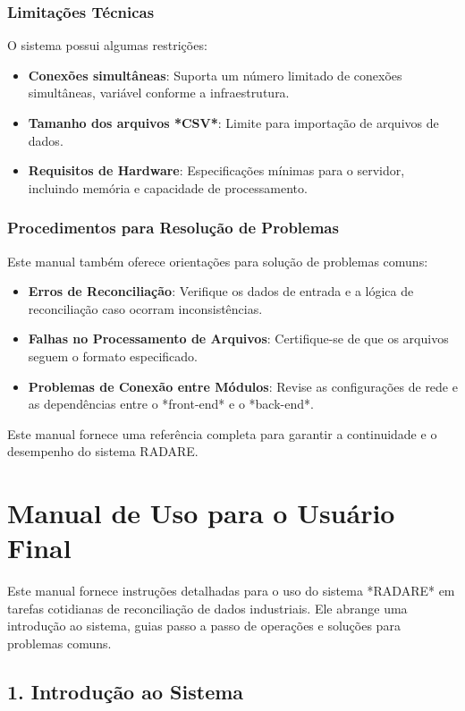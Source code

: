 \subsection*{Limitações Técnicas}

O sistema possui algumas restrições:
\begin{itemize}
    \item \textbf{Conexões simultâneas}: Suporta um número limitado de conexões simultâneas, variável conforme a infraestrutura.
    \item \textbf{Tamanho dos arquivos *CSV*}: Limite para importação de arquivos de dados.
    \item \textbf{Requisitos de Hardware}: Especificações mínimas para o servidor, incluindo memória e capacidade de processamento.
\end{itemize}

\subsection*{Procedimentos para Resolução de Problemas}

Este manual também oferece orientações para solução de problemas comuns:
\begin{itemize}
    \item \textbf{Erros de Reconciliação}: Verifique os dados de entrada e a lógica de reconciliação caso ocorram inconsistências.
    \item \textbf{Falhas no Processamento de Arquivos}: Certifique-se de que os arquivos seguem o formato especificado.
    \item \textbf{Problemas de Conexão entre Módulos}: Revise as configurações de rede e as dependências entre o *front-end* e o *back-end*.
\end{itemize}

Este manual fornece uma referência completa para garantir a continuidade e o desempenho do sistema RADARE.

\chapter{Manual de Uso para o Usuário Final}
\label{Anexo:manualUsuario}

Este manual fornece instruções detalhadas para o uso do sistema *RADARE* em tarefas cotidianas de reconciliação de dados industriais. Ele abrange uma introdução ao sistema, guias passo a passo de operações e soluções para problemas comuns.

\section*{1. Introdução ao Sistema}

